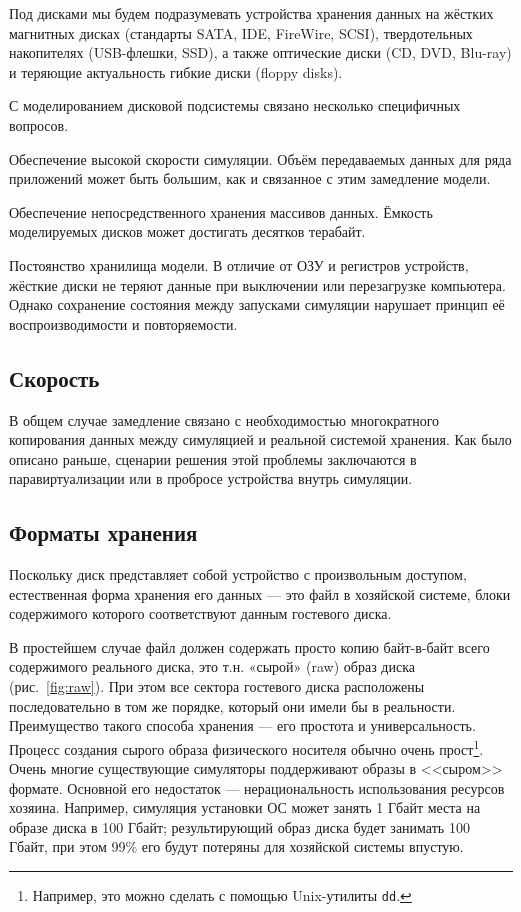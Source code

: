 Под дисками мы будем подразумевать устройства хранения данных на жёстких магнитных дисках (стандарты SATA, IDE, FireWire, SCSI), твердотельных накопителях (USB-флешки, SSD), а также оптические диски (CD, DVD, Blu-ray) и теряющие актуальность гибкие диски (\abbr floppy disks).

С моделированием дисковой подсистемы связано несколько специфичных вопросов.

\begin{itemize*}
\item Обеспечение высокой скорости симуляции. Объём передаваемых данных для ряда приложений может быть большим, как и связанное с этим замедление модели.

\item Обеспечение непосредственного хранения массивов данных. Ёмкость моделируемых дисков может достигать десятков терабайт.
\item Постоянство хранилища модели. В отличие от ОЗУ и регистров устройств, жёсткие диски не теряют данные при выключении или перезагрузке компьютера. Однако сохранение состояния между запусками симуляции нарушает принцип её воспроизводимости и повторяемости.
\end{itemize*}

\subsection{Скорость}

В общем случае замедление связано с необходимостью многократного копирования данных между симуляцией и реальной системой хранения. Как было описано раньше, сценарии решения этой проблемы заключаются в паравиртуализации или в пробросе устройства внутрь симуляции.

\subsection{Форматы хранения}

Поскольку диск представляет собой устройство с произвольным доступом, естественная форма хранения его данных --- это файл в хозяйской системе, блоки содержимого которого соответствуют данным гостевого диска.

В простейшем случае файл должен содержать просто копию байт-в-байт всего содержимого реального диска, это т.н. «сырой» (\abbr raw) образ диска (рис.~\ref{fig:raw}). При этом все сектора гостевого диска расположены последовательно в том же порядке, который они имели бы  в реальности. Преимущество такого способа хранения --- его простота и универсальность. Процесс создания сырого образа физического носителя обычно очень прост\footnote{Например, это можно сделать с помощью Unix-утилиты \texttt{dd}.}. Очень многие существующие симуляторы поддерживают образы в <<сыром>> формате. Основной его недостаток --- нерациональность использования ресурсов хозяина. Например, симуляция установки ОС может занять 1 Гбайт места на образе диска в 100 Гбайт; результирующий образ диска будет занимать 100 Гбайт, при этом 99\% его будут потеряны для хозяйской системы впустую.

